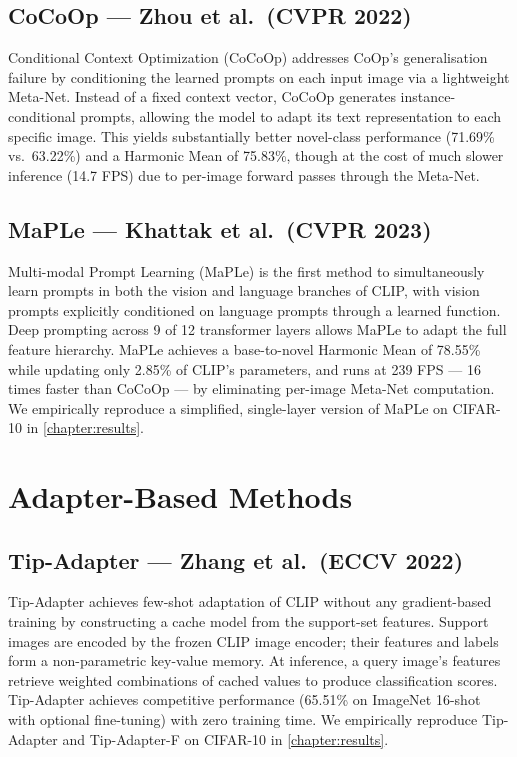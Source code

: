 \documentclass{iutbscthesis}
\begin{document}
\subsection{CoCoOp --- Zhou et al.\ (CVPR 2022)}
Conditional Context Optimization (CoCoOp) \cite{zhou2022cocoop} addresses CoOp's generalisation failure by conditioning the learned prompts on each input image via a lightweight Meta-Net. Instead of a fixed context vector, CoCoOp generates instance-conditional prompts, allowing the model to adapt its text representation to each specific image. This yields substantially better novel-class performance (71.69\% vs.\ 63.22\%) and a Harmonic Mean of 75.83\%, though at the cost of much slower inference (14.7 FPS) due to per-image forward passes through the Meta-Net.

\subsection{MaPLe --- Khattak et al.\ (CVPR 2023)}
Multi-modal Prompt Learning (MaPLe) \cite{khattak2023maple} is the first method to simultaneously learn prompts in both the vision and language branches of CLIP, with vision prompts explicitly conditioned on language prompts through a learned function. Deep prompting across 9 of 12 transformer layers allows MaPLe to adapt the full feature hierarchy. MaPLe achieves a base-to-novel Harmonic Mean of 78.55\% while updating only 2.85\% of CLIP's parameters, and runs at 239 FPS --- 16 times faster than CoCoOp --- by eliminating per-image Meta-Net computation. We empirically reproduce a simplified, single-layer version of MaPLe on CIFAR-10 in \autoref{chapter:results}.

\section{Adapter-Based Methods} \label{sec:adaptermethods}

\subsection{Tip-Adapter --- Zhang et al.\ (ECCV 2022)}
Tip-Adapter \cite{zhang2022tipadapter} achieves few-shot adaptation of CLIP without any gradient-based training by constructing a cache model from the support-set features. Support images are encoded by the frozen CLIP image encoder; their features and labels form a non-parametric key-value memory. At inference, a query image's features retrieve weighted combinations of cached values to produce classification scores. Tip-Adapter achieves competitive performance (65.51\% on ImageNet 16-shot with optional fine-tuning) with zero training time. We empirically reproduce Tip-Adapter and Tip-Adapter-F on CIFAR-10 in \autoref{chapter:results}.
\end{document}
